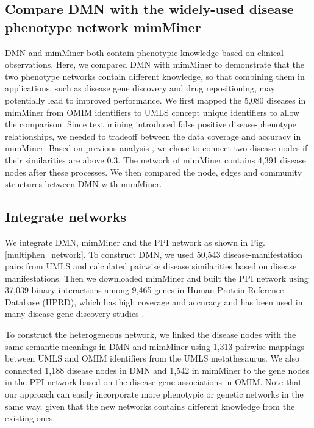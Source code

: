 \subsection{Compare DMN with the widely-used disease phenotype network mimMiner}
DMN and mimMiner both contain phenotypic knowledge based on clinical observations.
Here, we compared DMN with mimMiner to demonstrate that the two phenotype networks
contain different knowledge, so that combining them in applications, such as disease gene discovery and
drug repositioning, may potentially lead to improved performance.
We first mapped the 5,080 diseases in mimMiner from OMIM identifiers to UMLS concept unique identifiers to allow the comparison.
Since text mining introduced false positive disease-phenotype relationships, we needed to tradeoff between the data coverage and accuracy in mimMiner.
Based on previous analysis \cite{van2006text}, we chose to connect two disease nodes if their similarities are above 0.3.
The network of mimMiner contains 4,391 disease nodes after these processes.
We then compared the node, edges and community structures between DMN with mimMiner.


\subsection{Integrate networks}
We integrate DMN, mimMiner and the PPI network as shown in Fig.\ref{multiphen_network}.
To construct DMN, we used 50,543 disease-manifestation pairs
from UMLS and calculated pairwise disease similarities based on disease manifestations.
Then we downloaded mimMiner \cite{van2006text} and built the
PPI network using 37,039 binary interactions among 9,465 genes in
Human Protein Reference Database (HPRD), which has
high coverage and accuracy \cite{moreau2012computational} and has
been used in many disease gene discovery studies
\cite{li2010genome,wu2008network,wu2009align,vanunu2010associating}.

To construct the heterogeneous network, we linked the disease nodes
with the same semantic meanings in DMN and mimMiner
using 1,313 pairwise mappings between UMLS and
OMIM identifiers from the UMLS metathesaurus.
We also connected 1,188 disease nodes in DMN and 1,542 in
mimMiner to the gene nodes in the PPI network
based on the disease-gene associations in OMIM.
Note that our approach can easily incorporate more
phenotypic or genetic networks in the same way,
given that the new networks contains different knowledge
from the existing ones.

